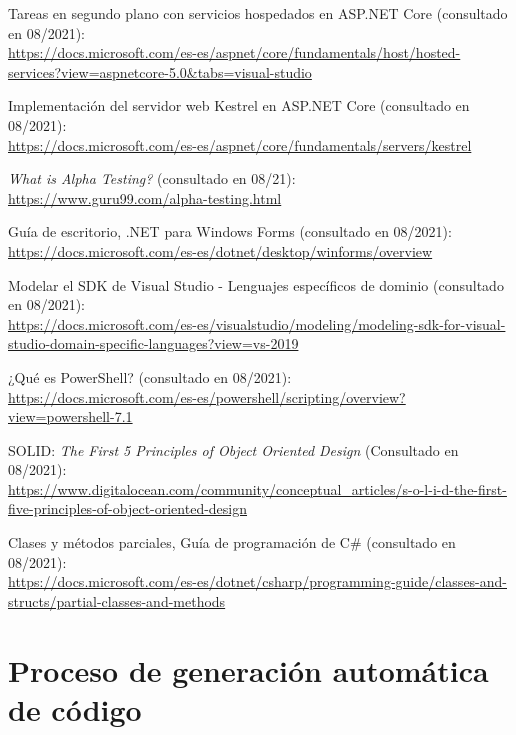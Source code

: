 \documentclass[11pt,spanish,listoffigures]{tfgetsinf}
\begin{document}
\begin{thebibliography}{10}
Tareas en segundo plano con servicios hospedados en ASP.NET Core (consultado en 08/2021):\\
\url{https://docs.microsoft.com/es-es/aspnet/core/fundamentals/host/hosted-services?view=aspnetcore-5.0&tabs=visual-studio}

Implementación del servidor web Kestrel en ASP.NET Core (consultado en 08/2021):\\
\url{https://docs.microsoft.com/es-es/aspnet/core/fundamentals/servers/kestrel}

\emph{What is Alpha Testing?} (consultado en 08/21):\\
\url{https://www.guru99.com/alpha-testing.html}

Guía de escritorio, .NET para Windows Forms (consultado en 08/2021):\\
\url{https://docs.microsoft.com/es-es/dotnet/desktop/winforms/overview}

Modelar el SDK de Visual Studio - Lenguajes específicos de dominio (consultado en 08/2021):\\
\url{https://docs.microsoft.com/es-es/visualstudio/modeling/modeling-sdk-for-visual-studio-domain-specific-languages?view=vs-2019}

¿Qué es PowerShell? (consultado en 08/2021):\\
\url{https://docs.microsoft.com/es-es/powershell/scripting/overview?view=powershell-7.1}

SOLID: \emph{The First 5 Principles of Object Oriented Design} (Consultado en 08/2021):\\
\url{https://www.digitalocean.com/community/conceptual_articles/s-o-l-i-d-the-first-five-principles-of-object-oriented-design}

Clases y métodos parciales, Guía de programación de C\# (consultado en 08/2021):\\
\url{https://docs.microsoft.com/es-es/dotnet/csharp/programming-guide/classes-and-structs/partial-classes-and-methods}

\end{thebibliography}


\APPENDIX

\chapter{Proceso de generación automática de código}
\end{document}
